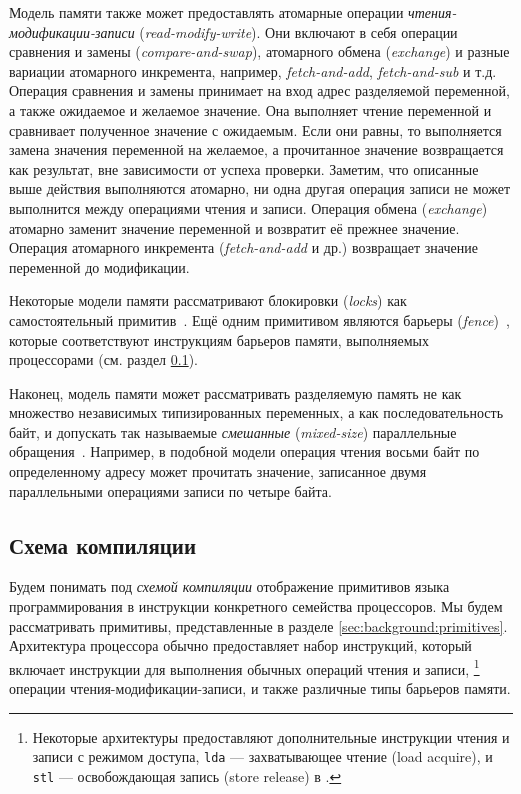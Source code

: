 Модель памяти также может предоставлять атомарные операции 
\emph{чтения-модификации-записи} (\emph{read-modify-write}).
Они включают в себя операции сравнения и замены (\emph{compare-and-swap}), 
атомарного обмена (\emph{exchange}) и разные вариации атомарного инкремента, 
например, \emph{fetch-and-add}, \emph{fetch-and-sub} и т.д. 
Операция сравнения и замены принимает на вход 
адрес разделяемой переменной, а также ожидаемое и желаемое значение.
Она выполняет чтение переменной и сравнивает полученное значение 
с ожидаемым. Если они равны, то выполняется замена значения переменной 
на желаемое, а прочитанное значение возвращается как результат, 
вне зависимости от успеха проверки. 
Заметим, что описанные выше действия выполняются атомарно, 
ни одна другая операция записи не может выполнится между 
операциями чтения и записи.
Операция обмена (\emph{exchange}) атомарно 
заменит значение переменной и возвратит её прежнее значение. 
Операция атомарного инкремента (\emph{fetch-and-add} и др.)  возвращает значение переменной до модификации.  

Некоторые модели памяти рассматривают 
блокировки (\emph{locks}) как самостоятельный примитив~\cite{Manson-al:POPL05}. 
Ещё одним примитивом являются барьеры (\emph{fence})~\cite{Batty-al:POPL11},
которые соответствуют инструкциям барьеров памяти, 
выполняемых процессорами  
(см. раздел \cref{sec:background:compile}). 

Наконец, модель памяти может рассматривать разделяемую память 
не как множество независимых типизированных переменных, 
а как последовательность байт, и допускать 
так называемые \emph{смешанные} (\emph{mixed-size}) 
параллельные обращения~\cite{Flur-al:POPL17}. 
Например, в подобной модели операция чтения восьми байт по определенному адресу
может прочитать значение, записанное двумя параллельными 
операциями записи по четыре байта.

\subsection{Схема компиляции}
\label{sec:background:compile}

Будем понимать под \emph{схемой компиляции} отображение
примитивов языка программирования в инструкции 
конкретного семейства процессоров.  
Мы будем рассматривать примитивы, представленные в 
разделе \cref{sec:background:primitives}.
Архитектура процессора обычно предоставляет 
набор инструкций, который включает 
инструкции для выполнения обычных операций чтения и записи,%
\footnote{Некоторые архитектуры
предоставляют дополнительные инструкции чтения и 
записи с режимом доступа, \eg 
\eg \texttt{lda} --- захватывающее чтение (load acquire), 
и \texttt{stl} --- освобождающая запись (store release) в .} 
операции чтения-модификации-записи, и 
также различные типы барьеров памяти.

